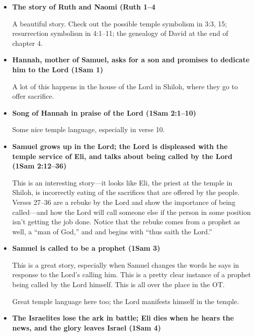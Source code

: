 \begin{itemize}
	Phinehas makes an appearance in this story. Also, the people ask at the ``house of the Lord'' what they should do, and they aren't able to succeed until after they have fasted and offered the burnt and peace offerings to the Lord. That's a nice though and could be good for a lesson.
	
\item \textbf{The story of Ruth and Naomi (Ruth 1--4}

	A beautiful story. Check out the possible temple symbolism in 3:3, 15; resurrection symbolism in 4:1--11; the genealogy of David at the end of chapter 4.
	
\item \textbf{Hannah, mother of Samuel, asks for a son and promises to dedicate him to the Lord (1Sam 1)}

	A lot of this happens in the house of the Lord in Shiloh, where they go to offer sacrifice.
	
\item \textbf{Song of Hannah in praise of the Lord (1Sam 2:1--10)}

	Some nice temple language, especially in verse 10.
	
\item \textbf{Samuel grows up in the Lord; the Lord is displeased with the temple service of Eli, and talks about being called by the Lord (1Sam 2:12--36)}

	This is an interesting story---it looks like Eli, the priest at the temple in Shiloh, is incorrectly eating of the sacrifices that are offered by the people. Verses 27--36 are a rebuke by the Lord and show the importance of being called---and how the Lord will call someone else if the person in some position isn't getting the job done. Notice that the rebuke comes from a prophet as well, a ``man of God,'' and and begins with ``thus saith the Lord.''
	
\item \textbf{Samuel is called to be a prophet (1Sam 3)}

	This is a great story, especially when Samuel changes the words he says in response to the Lord's calling him. This is a pretty clear instance of a prophet being called by the Lord himself. This is all over the place in the OT.
	
	Great temple language here too; the Lord manifests himself in the temple.
	
\item \textbf{The Israelites lose the ark in battle; Eli dies when he hears the news, and the glory leaves Israel (1Sam 4)}


\end{itemize}

